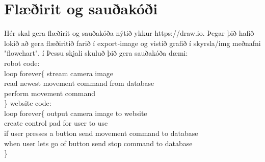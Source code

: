 \section{Flæðirit og sauðakóði}Hér skal gera flæðirit og sauðakóða nýtið ykkur https://draw.io. Þegar þið hafið lokið að gera flæðiritið farið í export-image og vistið grafið í skyrsla/img meðnafni "flowchart". í Þessu skjali skuluð þið gera sauðakóða 
dæmi:\\
robot code:\\
loop forever\{
   stream camera image\\
   read newest movement command from database\\
   perform movement command\\
\}
website code:\\
loop forever\{
   output camera image to website\\
   create control pad for user to use\\
   if user presses a button send movement command to database\\
   when user lets go of button send stop command to database\\
\}

